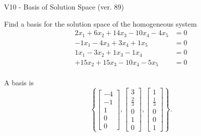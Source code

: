 \begin{exercise}
  \begin{exerciseTitle}V10 - Basis of Solution Space (ver. 89)\end{exerciseTitle}
  \begin{exerciseStatement}
    Find a basis for the solution space of the homogeneous system 
\begin{align*}
 2 x_ 1 + 6 x_ 2 + 14 x_ 3 -10 x_ 4 -4 x_ 5 &= 0  \\ 
  -1 x_ 1 -4 x_ 3 + 3 x_ 4 + 1 x_ 5 &= 0  \\ 
  1 x_ 1 -3 x_ 2 + 1 x_ 3 -1 x_ 4 &= 0  \\ 
  + 15 x_ 2 + 15 x_ 3 -10 x_ 4 -5 x_ 5 &= 0  \\ 
 \end{align*}


 
  \end{exerciseStatement}

  \begin{exerciseAnswer}
   A basis is   
\[\left\{\left[\begin{array}{c}
-4 \\
-1 \\
1 \\
0 \\
0
\end{array}\right] , \left[\begin{array}{c}
3 \\
\frac{2}{3} \\
0 \\
1 \\
0
\end{array}\right] , \left[\begin{array}{c}
1 \\
\frac{1}{3} \\
0 \\
0 \\
1
\end{array}\right]\right\}.\]

  


  \end{exerciseAnswer}
\end{exercise}